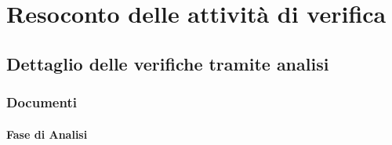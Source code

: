 \newpage
\section{Resoconto delle attività di verifica}

	\subsection{Dettaglio delle verifiche tramite analisi}
	
	\subsubsection{Documenti}
	
	\paragraph{Fase di Analisi}
	
	
